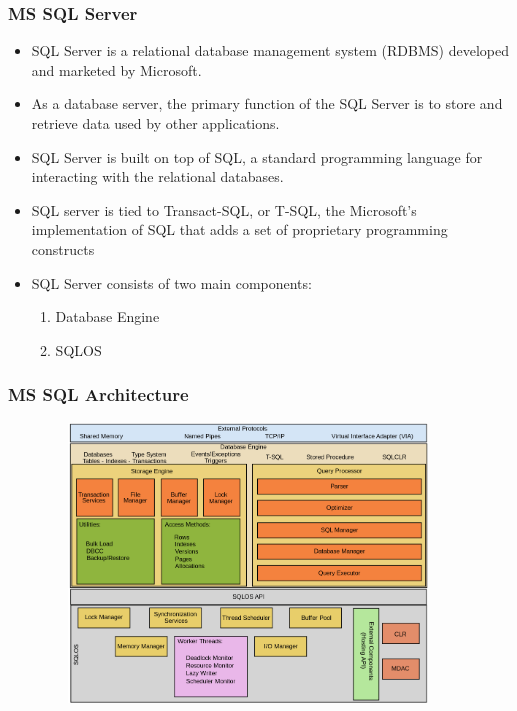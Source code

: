 \begin{frame}

	\frametitle{MS SQL Server}
	
	\begin{itemize}
	
	    \item SQL Server is a relational database management system (RDBMS) developed and marketed by Microsoft.
	
	    \item  As a database server, the primary function of the SQL Server is to store and retrieve data used by other applications.
	
     	\item  SQL Server is built on top of SQL, a standard programming language for interacting with the relational databases. 
     	
     	\item SQL server is tied to Transact-SQL, or T-SQL, the Microsoft’s implementation of SQL that adds a set of proprietary programming constructs
     	
     	\item SQL Server consists of two main components:
     			\begin{enumerate}
     		
     		\item 	Database Engine
     		
     		\item 	SQLOS 
     		
     	\end{enumerate}
     
     
     	
	
	\end{itemize}
	
\end{frame}


\begin{frame}
	
	\frametitle{MS SQL Architecture}
	
	\begin{figure}
		\centering
		\includegraphics[width=300pt,height=210pt]{figures/What-is-SQL-Server-SQL-Server-Architecture.png}
	\label{fig:ms sql architecture}
\end{figure}

\end{frame}


